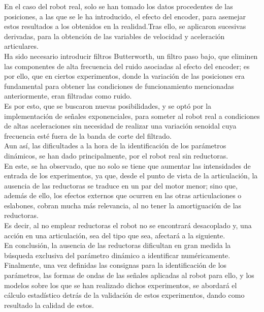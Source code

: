 En el caso del robot real, solo se han tomado los datos procedentes de las posiciones, a las que se le ha introducido, el efecto del encoder, para asemejar estos resultados a los obtenidos en la realidad.Tras ello, se aplicaron sucesivas derivadas, para la obtención de las variables de velocidad y aceleración articulares.\\

Ha sido necesario introducir filtros Butterworth, un filtro paso bajo, que eliminen las componentes de alta frecuencia del ruido asociadas al efecto del encoder; es por ello, que en ciertos experimentos, donde la variación de las posiciones era fundamental para obtener las condiciones de funcionamiento mencionadas anteriormente, eran filtradas como ruido. \\
Es por esto, que se buscaron nuevas posibilidades, y se optó por la implementación de señales exponenciales, para someter al robot real a condiciones de altas aceleraciones sin necesidad de realizar una variación senoidal cuya frecuencia esté fuera de la banda de corte del filtrado.\\

Aun así, las dificultades a la hora de la identificación de los parámetros dinámicos, se han dado principalmente, por el robot real sin reductoras.\\
En este, se ha observado, que no solo se tiene que aumentar las intensidades de entrada de los experimentos, ya que, desde el punto de vista de la articulación, la ausencia de las reductoras se traduce en un par del motor menor; sino que, además de ello, los efectos externos que ocurren en las otras articulaciones o eslabones, cobran mucha más relevancia, al no tener la amortiguación de las reductoras. \\
Es decir, al no emplear reductoras el robot no se encontrará desacoplado y, una acción en una articulación, sea del tipo que sea, afectará a la siguiente.\\
En conclusión, la ausencia de las reductoras dificultan en gran medida la búsqueda exclusiva del parámetro dinámico a identificar numéricamente.\\

Finalmente, una vez definidas las consignas para la identificación de los parámetros, las formas de ondas de las señales aplicadas al robot para ello, y los modelos sobre los que se han realizado dichos experimentos, se abordará el cálculo estadístico detrás de la validación de estos experimentos, dando como resultado la calidad de estos.\\

